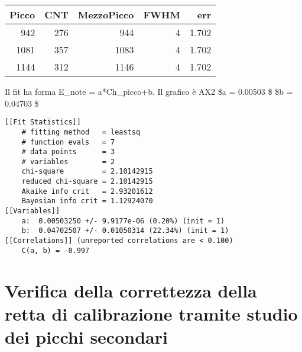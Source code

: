 \begin{longtable}[]{@{}rrrrr@{}}
\toprule
Picco & CNT & MezzoPicco & FWHM & err \\
\midrule
\endhead
942 & 276 & 944 & 4 & 1.702 \\
1081 & 357 & 1083 & 4 & 1.702 \\
1144 & 312 & 1146 & 4 & 1.702 \\
\bottomrule
\end{longtable}

Il fit ha forma E\_note = a*Ch\_picco+b. Il grafico è AX2 
\$a = 0.00503 \$
 \$b = 0.04703  \$

\begin{verbatim}
[[Fit Statistics]]
    # fitting method   = leastsq
    # function evals   = 7
    # data points      = 3
    # variables        = 2
    chi-square         = 2.10142915
    reduced chi-square = 2.10142915
    Akaike info crit   = 2.93201612
    Bayesian info crit = 1.12924070
[[Variables]]
    a:  0.00503250 +/- 9.9177e-06 (0.20%) (init = 1)
    b:  0.04702507 +/- 0.01050314 (22.34%) (init = 1)
[[Correlations]] (unreported correlations are < 0.100)
    C(a, b) = -0.997 
\end{verbatim}

\hypertarget{verifica-della-correttezza-della-retta-di-calibrazione-tramite-studio-dei-picchi-secondari}{%
\section{Verifica della correttezza della retta di calibrazione tramite
studio dei picchi
secondari}\label{verifica-della-correttezza-della-retta-di-calibrazione-tramite-studio-dei-picchi-secondari}}

